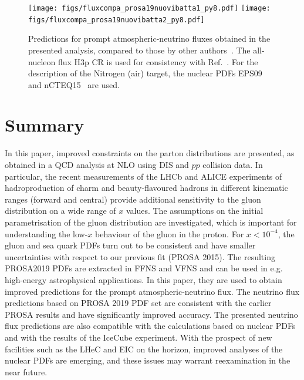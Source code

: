 \begin{figure}
\centering
    \texttt{[image: figs/fluxcompa\_prosa19nuovibatta1\_py8.pdf]}
    \texttt{[image: figs/fluxcompa\_prosa19nuovibatta2\_py8.pdf]}
  \caption{\label{fig5prompt} Predictions for prompt atmospheric-neutrino fluxes obtained in the presented analysis, compared to those by other authors~\cite{Bhattacharya:2016jce}. The all-nucleon flux H3p CR is used for consistency with Ref.~\cite{Bhattacharya:2016jce}. 
For the description of the Nitrogen (air) target, the nuclear PDFs EPS09~\cite{Eskola:2009uj} and nCTEQ15~\cite{Kovarik:2015cma} are used.}
\end{figure}

%
%
%


\section{Summary}
\label{sec:summary}

In this paper, improved constraints on the parton distributions are presented, as obtained in a QCD analysis at NLO using DIS and $pp$ collision data. In particular, the recent measurements of the LHCb and ALICE experiments of hadroproduction of charm and beauty-flavoured hadrons in different kinematic ranges (forward and central) provide additional sensitivity to the gluon distribution on a wide range of $x$ values. The assumptions on the initial parametrisation of the gluon distribution are investigated, which is important for understanding the low-$x$ behaviour of the gluon in the proton. For $x < 10^{-4}$, the gluon and sea quark PDFs turn out to be consistent and have smaller uncertainties with respect to our previous fit (PROSA 2015). The resulting PROSA2019 PDFs are extracted in FFNS and VFNS and can be used in e.g. high-energy astrophysical applications. In this paper, they  
 are used to obtain improved predictions for the prompt atmospheric-neutrino flux.
The neutrino flux predictions based on PROSA 2019 PDF set are consistent with the earlier PROSA results and have significantly improved accuracy. 
The presented neutrino flux predictions are also compatible with the calculations based on nuclear PDFs and with the results of the IceCube experiment. 
{\color{blue}With the prospect of new facilities such as the LHeC and EIC on the horizon, improved analyses of the nuclear PDFs are emerging, and these issues may warrant reexamination in the near future.}
